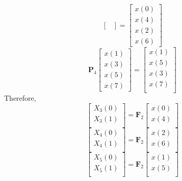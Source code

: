 \documentclass[journal,12pt,twocolumn]{IEEEtran}
\let\vec\mathbf
\numberwithin{equation}{section}
\renewcommand\thesection{\arabic{section}}
\begin{document}
\begin{enumerate}[label=\thesection.\arabic*]
\begin{equation}
\begin{bmatrix}
\end{bmatrix}
 = 
\begin{bmatrix}
x(0) \\ 
x(4) \\ 
x(2) \\
x(6)
\end{bmatrix}
\end{equation}
\begin{equation}
\vec{P}_{4}
\begin{bmatrix}
x(1) \\ 
x(3) \\ 
x(5) \\
x(7)
\end{bmatrix}
 = 
\begin{bmatrix}
x(1) \\ 
x(5) \\ 
x(3) \\ 
x(7) \\
\end{bmatrix}
\end{equation}
Therefore,
\begin{equation}
\begin{bmatrix}
X_{3}(0) \\ 
X_{3}(1)\\ 
\end{bmatrix}
= \vec{F}_{2}
\begin{bmatrix}
x(0) \\ 
x(4) \\ 
\end{bmatrix}
\end{equation}
\begin{equation}
\begin{bmatrix}
X_{4}(0) \\ 
X_{4}(1)\\ 
\end{bmatrix}
= \vec{F}_{2}
\begin{bmatrix}
x(2) \\ 
x(6) \\ 
\end{bmatrix}
\end{equation}
\begin{equation}
\begin{bmatrix}
X_{5}(0) \\ 
X_{5}(1)\\ 
\end{bmatrix}
= \vec{F}_{2}
\begin{bmatrix}
x(1) \\ 
x(5) \\ 

\end{bmatrix}
\end{equation}
\end{enumerate}
\end{document}
